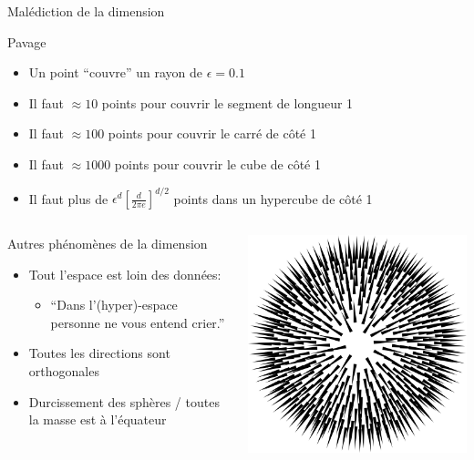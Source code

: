 \documentclass[presentation, aspectratio=169]{beamer}
\begin{document}
\begin{frame}{Malédiction de la dimension}
  \begin{block}{Pavage}
    \begin{itemize}
    \item Un point ``couvre'' un rayon de $\epsilon=0.1$
    \item Il faut $\approx10$ points pour couvrir le segment de
      longueur 1
    \item Il faut $\approx100$ points pour couvrir le carré de côté 1
    \item Il faut $\approx1000$ points pour couvrir le cube de côté 1
    \item Il faut plus de $\epsilon^d\left[\frac d{2\pi
          e}\right]^{d/2}$ points dans un hypercube de côté 1
    \end{itemize}
  \end{block}

  \begin{columns}
    \begin{block}{Autres phénomènes de la dimension}
      \begin{itemize}
      \item Tout l'espace est loin des données:
        \begin{itemize}
        \item ``Dans l'(hyper)-espace personne ne vous entend crier.''
        \end{itemize}
      \item Toutes les directions sont orthogonales
      \item Durcissement des sphères / toutes la masse est
        à l'équateur
      \end{itemize}
    \end{block}
    \includegraphics[width=\textwidth]{spiked-ball}
  \end{columns}
\end{frame}
\end{document}
